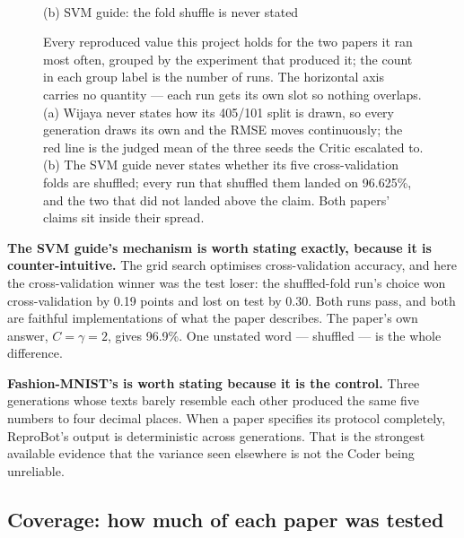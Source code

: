 \documentclass[11pt]{article}
\begin{document}
\begin{figure}[tbp]
\begin{minipage}[t]{0.49\linewidth}
{}\\[-1pt]
{\small (b) SVM guide: the fold shuffle is never stated}
\end{minipage}
\caption{Every reproduced value this project holds for the two papers it ran most often, grouped
by the experiment that produced it; the count in each group label is the number of runs. The
horizontal axis carries no quantity --- each run gets its own slot so nothing overlaps. (a) Wijaya
never states how its 405/101 split is drawn, so every generation draws its own and the RMSE moves
continuously; the red line is the judged mean of the three seeds the Critic escalated to. (b) The
SVM guide never states whether its five cross-validation folds are shuffled; every run that
shuffled them landed on 96.625\%, and the two that did not landed above the claim. Both papers'
claims sit inside their spread.}
\label{fig:spread}
\end{figure}


\textbf{The SVM guide's mechanism is worth stating exactly, because it is counter-intuitive.}
The grid search optimises cross-validation accuracy, and here the cross-validation winner was the
test loser: the shuffled-fold run's choice won cross-validation by 0.19 points and lost on test by
0.30. Both runs pass, and both are faithful implementations of what the paper describes. The
paper's own answer, $C = \gamma = 2$, gives 96.9\%. One unstated word --- shuffled --- is the whole
difference.

\textbf{Fashion-MNIST's is worth stating because it is the control.} Three generations whose
texts barely resemble each other produced the same five numbers to four decimal places. When a
paper specifies its protocol completely, ReproBot's output is deterministic across generations.
That is the strongest available evidence that the variance seen elsewhere is not the Coder being
unreliable.

\subsection{Coverage: how much of each paper was tested}
\end{document}
